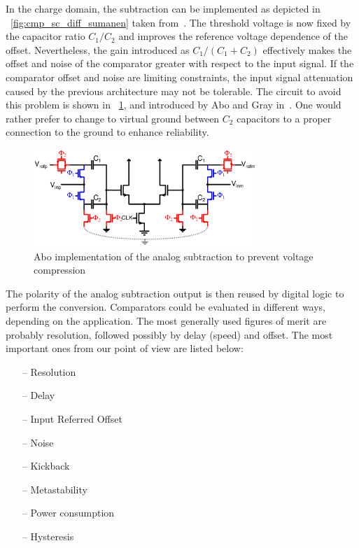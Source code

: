 In the charge domain, the subtraction can be implemented as depicted in \figurename~\ref{fig:cmp_sc_diff_sumanen} taken from~\cite{Sumanen2002}. The threshold voltage is now fixed by the capacitor ratio \(C_1/C_2 \) and improves the reference voltage dependence of the offset. Nevertheless, the gain introduced as \(C_1/(C_1+C_2) \) effectively makes the offset and noise of the comparator greater with respect to the input signal. If the comparator offset and noise are limiting constraints, the input signal attenuation caused by the previous architecture may not be tolerable. The circuit to avoid this problem is shown in \figurename~\ref{fig:abo_sc}, and introduced by Abo and Gray in~\cite{Abo1999}. One would rather prefer to change to virtual ground between \(C_2\) capacitors to a proper connection to the ground to enhance reliability.

\begin{figure}[htp]
	\centering
    \includegraphics[width=0.75\textwidth]{Chapter7/Figs/abo_sc.ps}
	\caption{Abo implementation of the analog subtraction to prevent voltage compression}
	\label{fig:abo_sc}
\end{figure}

The polarity of the analog subtraction output is then reused by digital logic to perform the conversion. Comparators could be evaluated in different ways, depending on the application. The most generally used figures of merit are probably resolution, followed possibly by delay (speed) and offset. The most important ones from our point of view are listed below:
\begin{multicols}{2}
    \begin{itemize}
        \itemsep-0.5em
        \item[--] Resolution
        \item[--] Delay
        \item[--] Input Referred Offset
        \item[--] Noise
        \item[--] Kickback
        \item[--] Metastability
        \item[--] Power consumption
        \item[--] Hysteresis
    \end{itemize}
\end{multicols}

